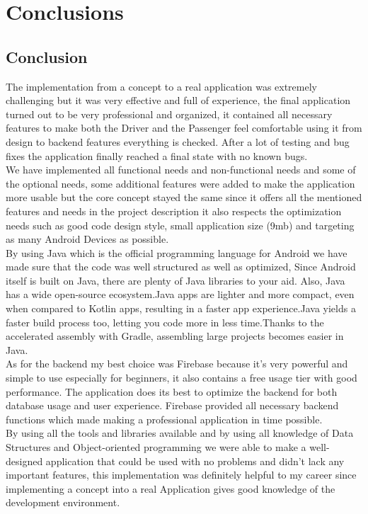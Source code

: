 \chapter{Conclusions}\label{chap:conclusions}

\section{Conclusion}
The implementation from a concept to a real application was extremely challenging but it was very effective and full of experience, the final application turned out to be very professional and organized, it contained all necessary features to make both the Driver and the Passenger feel comfortable using it from design to backend features everything is checked. After a lot of testing and bug fixes the application finally reached a final state with no known bugs. 
\\  We have implemented all functional needs and non-functional needs and some of the optional needs, some additional features were added to make the application more usable but the core concept stayed the same since it offers all the mentioned features and needs in the project description it also respects the optimization needs such as good code design style, small application size (9mb) and targeting as many Android Devices as possible.
\\ By using Java which is the official programming language for Android we have made sure that the code was well structured as well as optimized, Since Android itself is built on Java, there are plenty of Java libraries to your aid. Also, Java has a wide open-source ecosystem.Java apps are lighter and more compact, even when compared to Kotlin apps, resulting in a faster app experience.Java yields a faster build process too, letting you code more in less time.Thanks to the accelerated assembly with Gradle, assembling large projects becomes easier in Java.
\\ As for the backend my best choice was Firebase because it’s very powerful and simple to use especially for beginners, it also contains a free usage tier with good performance. The application does its best to optimize the backend for both database usage and user experience. Firebase provided all necessary backend functions which made making a professional application in time possible. 
\\  By using all the tools and libraries available and by using all knowledge of Data Structures and Object-oriented programming we were able to make a well-designed application that could be used with no problems and didn’t lack any important features, this implementation was definitely helpful to my career since implementing a concept into a real Application gives good knowledge of the development environment. 

